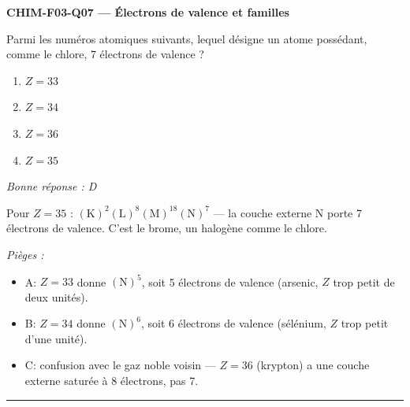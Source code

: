 \documentclass[11pt,a4paper]{article}
\begin{document}
\noindent\textbf{CHIM-F03-Q07 --- Électrons de valence et familles}\par
Parmi les numéros atomiques suivants, lequel désigne un atome possédant, comme le chlore, \num{7} électrons de valence ?
\begin{enumerate}[label=\Alph*)]
\item $Z=33$
\item $Z=34$
\item $Z=36$
\item $Z=35$
\end{enumerate}
\textit{Bonne réponse : D}\par
Pour $Z=35$ : $(\mathrm{K})^2(\mathrm{L})^8(\mathrm{M})^{18}(\mathrm{N})^7$ --- la couche externe N porte \num{7} électrons de valence. C'est le brome, un halogène comme le chlore.\par
\textit{Pièges :}
\begin{itemize}
\item A: $Z=33$ donne $(\mathrm{N})^5$, soit \num{5} électrons de valence (arsenic, $Z$ trop petit de deux unités).
\item B: $Z=34$ donne $(\mathrm{N})^6$, soit \num{6} électrons de valence (sélénium, $Z$ trop petit d'une unité).
\item C: confusion avec le gaz noble voisin --- $Z=36$ (krypton) a une couche externe saturée à \num{8} électrons, pas \num{7}.
\end{itemize}
\vspace{8pt}\hrule\vspace{8pt}
\end{document}
